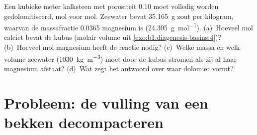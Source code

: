 \begin{exercise}[$\star\star\star$]\label{exo:b1:diagenesis-basins:12}
Een kubieke meter kalksteen met porositeit \num{0.10} moet volledig worden gedolomitiseerd, mol voor mol. Zeewater bevat \qty{35.165}{g} zout per kilogram, waarvan de massafractie \num{0.0365} magnesium is (\qty{24.305}{g.mol^{-1}}). (a)~Hoeveel mol calciet bevat de kubus (molair volume uit \cref{exo:b1:diagenesis-basins:4})? (b)~Hoeveel mol magnesium heeft de reactie nodig? (c)~Welke massa en welk volume zeewater (\qty{1030}{kg.m^{-3}}) moet door de kubus stromen als zij al haar magnesium afstaat? (d)~Wat zegt het antwoord over waar dolomiet vormt?
\end{exercise}

\section{Probleem: de vulling van een bekken decompacteren}

